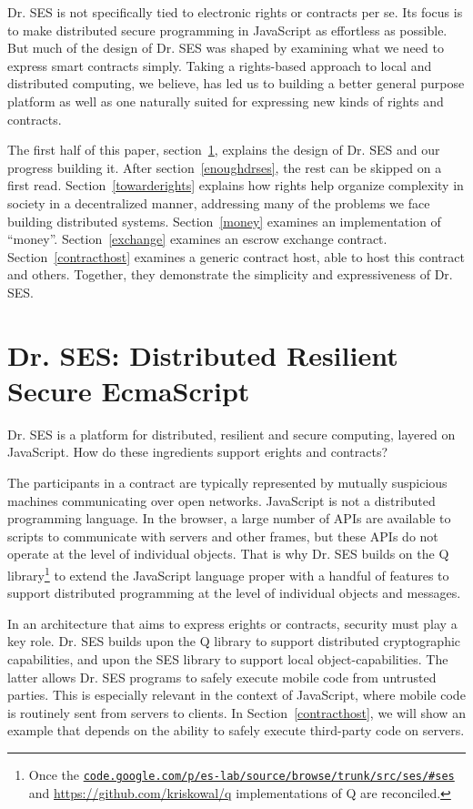 \documentclass{llncs}
\newcommand{\myurl}[1]{{\href{http://#1}{\texttt{#1}}}}
\begin{document}
Dr. SES is not specifically tied to electronic rights or contracts per se. Its focus is to make distributed secure programming in JavaScript as effortless as possible. But much of the design of Dr. SES
%
%
was shaped by examining what we need to express smart contracts simply. Taking a rights-based approach to local and distributed computing, we believe, has led us to building a better general purpose platform as well as one naturally suited for expressing new kinds of rights and contracts.

The first half of this paper, section~\ref{drses}, explains the design of Dr. SES and our progress building it.  After section~\ref{enoughdrses}, the rest can be skipped on a first read. Section~\ref{towarderights} explains how rights help organize complexity in society in a decentralized manner, addressing many of the problems we face building distributed systems. Section~\ref{money} examines an implementation of ``money''. Section~\ref{exchange} examines an escrow exchange contract. Section~\ref{contracthost} examines a generic contract host, able to host this contract and others. Together, they demonstrate the simplicity and expressiveness of Dr. SES.



\section{Dr. SES: Distributed Resilient Secure EcmaScript}
\label{drses}

Dr. SES is a platform for distributed, resilient and secure computing, layered on JavaScript. How do these ingredients support erights and contracts?

The participants in a contract are typically represented by mutually suspicious machines communicating over open networks. JavaScript is not a distributed programming language. In the browser, a large number of APIs are available to scripts to communicate with servers and other frames, but these APIs do not operate at the level of individual objects. That is why Dr. SES builds on the Q library\footnote{
%
Once the \myurl{code.google.com/p/es-lab/source/browse/trunk/src/ses/\#ses} and \url{https://github.com/kriskowal/q} implementations of Q are reconciled.
%
} to extend the JavaScript language proper with a handful of features to support distributed programming at the level of individual objects and messages.

In an architecture that aims to express erights or contracts, security must play a key role. Dr. SES builds upon the Q library to support distributed cryptographic capabilities, and upon the SES library to support local object-capabilities. The latter allows Dr. SES programs to safely execute mobile code from untrusted parties.
This is especially relevant in the context of JavaScript, where mobile code is routinely sent from servers to clients. In Section~\ref{contracthost}, we will show an example that  depends on the ability to safely execute third-party code on servers.
\end{document}
